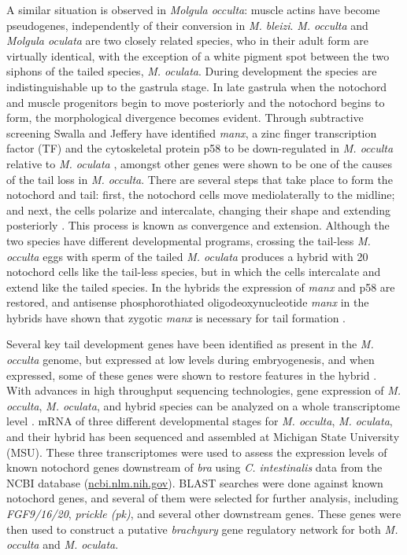 A similar situation is observed in \textit{Molgula occulta}: muscle actins have become pseudogenes, independently of their conversion in \textit{M. bleizi}. \textit{M. occulta} and \textit{Molgula oculata} are two closely related species, who in their adult form are virtually identical, with the exception of a white pigment spot between the two siphons of the tailed species, \textit{M. oculata}. During development the species are indistinguishable up to the gastrula stage. In late gastrula when the notochord and muscle progenitors begin to move posteriorly \cite{swalla_novel_1993} and the notochord begins to form, the morphological divergence becomes evident. Through subtractive screening Swalla and Jeffery \cite{swalla_requirement_1996} have identified \textit{manx}, a zinc finger transcription factor (TF) and the cytoskeletal protein p58 to be down-regulated in \textit{M. occulta} relative to \textit{M. oculata} \cite{swalla_identification_1991}, amongst other genes were shown to be one of the causes of the tail loss in \textit{M. occulta}. There are several steps that take place to form the notochord and tail: first, the notochord cells move mediolaterally to the midline; and next, the cells polarize and intercalate, changing their shape and extending posteriorly \cite{keller_mechanisms_2000, jiang_ascidian_2005,stemple_structure_2005}. This process is known as convergence and extension. Although the two species have different developmental programs, crossing the tail-less \textit{M. occulta} eggs with sperm of the tailed \textit{M. oculata} produces a hybrid with 20 notochord cells like the tail-less species, but in which the cells intercalate and extend like the tailed species. In the hybrids the expression of \textit{manx} and p58 are restored, and antisense phosphorothiated oligodeoxynucleotide \textit{manx} in the hybrids have shown that zygotic \textit{manx} is necessary for tail formation \cite{swalla_requirement_1996}.

Several key tail development genes have been identified as present in the \textit{M. occulta} genome, but expressed at low levels during embryogenesis, and when expressed, some of these genes were shown to restore features in the hybrid \cite{swalla_interspecific_1990,jeffery_factors_1992,swalla_novel_1993, swalla_requirement_1996}. With advances in high throughput sequencing technologies, gene expression of \textit{M. occulta}, \textit{M. oculata}, and hybrid species can be analyzed on a whole transcriptome level \cite{gyoja_analysis_2007,pickrell_variation_2010}. mRNA of three different developmental stages for \textit{M. occulta}, \textit{M. oculata}, and their hybrid has been sequenced and assembled at Michigan State University (MSU). These three transcriptomes were used to%
assess the expression levels of known notochord genes downstream of \textit{bra} using \textit{C. intestinalis} data from the NCBI database (\url{ncbi.nlm.nih.gov}). BLAST searches were done against known notochord genes, and several of them were selected for further analysis, including \textit{FGF9/16/20}, \textit{prickle (pk)}, and several other downstream genes.  These genes were then used to construct a putative \textit{brachyury} gene regulatory network for both \textit{M. occulta} and \textit{M. oculata}. 

